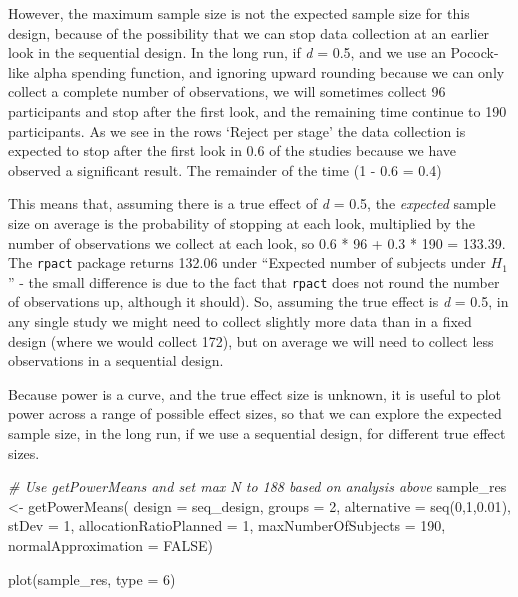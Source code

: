 \documentclass[
  oneside]{book}
\newenvironment{Shaded}{\begin{snugshade}}{\end{snugshade}}
\newcommand{\AttributeTok}[1]{\textcolor[rgb]{0.77,0.63,0.00}{#1}}
\newcommand{\CommentTok}[1]{\textcolor[rgb]{0.56,0.35,0.01}{\textit{#1}}}
\newcommand{\ConstantTok}[1]{\textcolor[rgb]{0.00,0.00,0.00}{#1}}
\newcommand{\DecValTok}[1]{\textcolor[rgb]{0.00,0.00,0.81}{#1}}
\newcommand{\FloatTok}[1]{\textcolor[rgb]{0.00,0.00,0.81}{#1}}
\newcommand{\FunctionTok}[1]{\textcolor[rgb]{0.00,0.00,0.00}{#1}}
\newcommand{\NormalTok}[1]{#1}
\newcommand{\OtherTok}[1]{\textcolor[rgb]{0.56,0.35,0.01}{#1}}
\begin{document}
However, the maximum sample size is not the expected sample size for this design, because of the possibility that we can stop data collection at an earlier look in the sequential design. In the long run, if \emph{d} = 0.5, and we use an Pocock-like alpha spending function, and ignoring upward rounding because we can only collect a complete number of observations, we will sometimes collect 96 participants and stop after the first look, and the remaining time continue to 190 participants. As we see in the rows `Reject per stage' the data collection is expected to stop after the first look in 0.6 of the studies because we have observed a significant result. The remainder of the time (1 - 0.6 = 0.4)

This means that, assuming there is a true effect of \emph{d} = 0.5, the \emph{expected} sample size on average is the probability of stopping at each look, multiplied by the number of observations we collect at each look, so 0.6 * 96 + 0.3 * 190 = 133.39. The \texttt{rpact} package returns 132.06 under ``Expected number of subjects under \(H_1\)'' - the small difference is due to the fact that \texttt{rpact} does not round the number of observations up, although it should). So, assuming the true effect is \emph{d} = 0.5, in any single study we might need to collect slightly more data than in a fixed design (where we would collect 172), but on average we will need to collect less observations in a sequential design.

Because power is a curve, and the true effect size is unknown, it is useful to plot power across a range of possible effect sizes, so that we can explore the expected sample size, in the long run, if we use a sequential design, for different true effect sizes.



\begin{Shaded}
\begin{Highlighting}[]
\CommentTok{\# Use getPowerMeans and set max N to 188 based on analysis above}
\NormalTok{sample\_res }\OtherTok{\textless{}{-}} \FunctionTok{getPowerMeans}\NormalTok{(}
  \AttributeTok{design =}\NormalTok{ seq\_design,}
  \AttributeTok{groups =} \DecValTok{2}\NormalTok{,}
  \AttributeTok{alternative =} \FunctionTok{seq}\NormalTok{(}\DecValTok{0}\NormalTok{,}\DecValTok{1}\NormalTok{,}\FloatTok{0.01}\NormalTok{), }
  \AttributeTok{stDev =} \DecValTok{1}\NormalTok{, }
  \AttributeTok{allocationRatioPlanned =} \DecValTok{1}\NormalTok{,}
  \AttributeTok{maxNumberOfSubjects =} \DecValTok{190}\NormalTok{, }
  \AttributeTok{normalApproximation =} \ConstantTok{FALSE}\NormalTok{)}

\FunctionTok{plot}\NormalTok{(sample\_res, }\AttributeTok{type =} \DecValTok{6}\NormalTok{)}
\end{Highlighting}
\end{Shaded}
\end{document}
